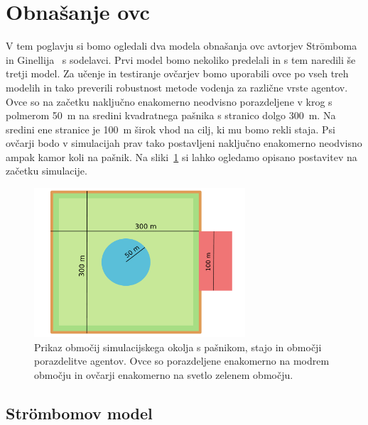 \section{Obnašanje ovc}

V tem poglavju si bomo ogledali dva modela obnašanja ovc avtorjev Str{\"o}mboma~\cite{Stroembom} in Ginellija~\cite{Ginelli} s sodelavci. Prvi model bomo nekoliko predelali in s tem naredili še tretji model. Za učenje in testiranje ovčarjev bomo uporabili ovce po vseh treh modelih in tako preverili robustnost metode vodenja za različne vrste agentov. Ovce so na začetku naključno enakomerno neodvisno porazdeljene v krog s polmerom 50~m na sredini kvadratnega pašnika s stranico dolgo 300~m. Na sredini ene stranice je 100~m širok vhod na cilj, ki mu bomo rekli staja. Psi ovčarji bodo v simulacijah prav tako postavljeni naključno enakomerno neodvisno ampak kamor koli na pašnik. Na sliki~\ref{fig:zemljevid} si lahko ogledamo opisano postavitev na začetku simulacije.
\begin{figure}[ht]  %
	\centering
	\includegraphics[width=0.7\textwidth]{../poglavja/images/simulacijsko_okolje.pdf}
	\caption[Območja simulacijskega okolja]{Prikaz območij simulacijskega okolja s pašnikom, stajo in območji porazdelitve agentov. Ovce so porazdeljene enakomerno na modrem območju in ovčarji enakomerno na svetlo zelenem območju.} %
	\label{fig:zemljevid}
\end{figure}

\subsection{Strömbomov model}\label{stroembom}

